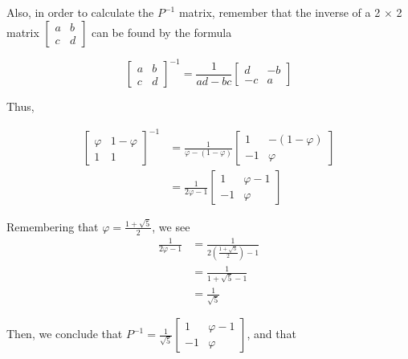 \documentclass{article}
\begin{document}
Also, in order to calculate the $P^{-1}$ matrix, remember that the inverse of a 2 $\times$ 2 matrix 
$\begin{bmatrix}
a & b\\
c & d
\end{bmatrix}$ 
can be found by the formula 

\begin{equation*}
   \begin{bmatrix}
   a & b \\
   c & d
   \end{bmatrix}^{-1} = \frac{1}{ad-bc} \begin{bmatrix}
    d & -b \\
    -c & a
    \end{bmatrix}
\end{equation*}

Thus, 

\begin{align*}
    \begin{bmatrix}
        \varphi & 1-\varphi \\
        1 & 1
    \end{bmatrix}^{-1} &= \frac{1}{\varphi-(1-\varphi)} \begin{bmatrix}
    1 & -(1-\varphi)\\
    -1 & \varphi
    \end{bmatrix} \\
    &= \frac{1}{2\varphi-1} \begin{bmatrix}
    1 & \varphi-1\\
    -1 & \varphi
    \end{bmatrix}
\end{align*}

Remembering that $\varphi = \frac{1+\sqrt{5}}{2}$, we see \begin{align*}
    \frac{1}{2\varphi -1 } &= \frac{1}{2 (\frac{1+\sqrt{5}}{2}) -1} \\
    &= \frac{1}{1+\sqrt{5} -1} \\
    &= \frac{1}{\sqrt{5}}
\end{align*}

Then, we conclude that $P^{-1} = \frac{1}{\sqrt{5}} \begin{bmatrix}
    1 & \varphi-1\\
    -1 & \varphi
    \end{bmatrix}$, and that
    
\end{document}
